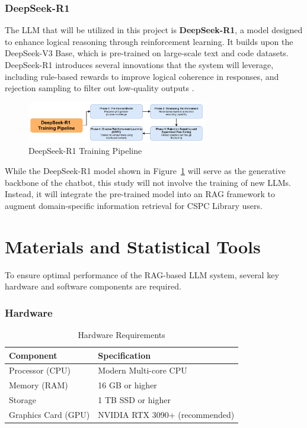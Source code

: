 \begin{refsection}
\subsubsection*{DeepSeek-R1}

The LLM that will be utilized in this project is \textbf{DeepSeek-R1}, a model designed to enhance logical reasoning through reinforcement learning. It builds upon the DeepSeek-V3 Base, which is pre-trained on large-scale text and code datasets. DeepSeek-R1 introduces several innovations that the system will leverage, including rule-based rewards to improve logical coherence in responses, and rejection sampling to filter out low-quality outputs \cite{deepseekai2025deepseekr1}.

\newpage
\clearpage

\begin{figure}[htbp]
    \centering
    \includegraphics[width=0.7\textwidth]{figures/deepsek.png}
    \caption{DeepSeek-R1 Training Pipeline}
    \label{fig:deepseek_pipeline}
\end{figure}

While the DeepSeek-R1 model shown in Figure~\ref{fig:deepseek_pipeline} will serve as the generative backbone of the chatbot, this study will not involve the training of new LLMs. Instead, it will integrate the pre-trained model into an RAG framework to augment domain-specific information retrieval for CSPC Library users.

\section{Materials and Statistical Tools}

To ensure optimal performance of the RAG-based LLM system, several key hardware and software components are required.

\subsubsection*{Hardware}
\begin{table}[H]
    \centering
    \caption{Hardware Requirements}
    \label{tab:hardware_requirements}
    \begin{tabular}{ll}
        \hline
        \textbf{Component}       & \textbf{Specification}                     \\ \hline
        Processor (CPU)          & Modern Multi-core CPU                      \\
        Memory (RAM)             & 16 GB or higher                            \\
        Storage                  & 1 TB SSD or higher                         \\
        Graphics Card (GPU)      & NVIDIA RTX 3090+ (recommended)             \\
        \hline
    \end{tabular}
\end{table}


\end{refsection}
